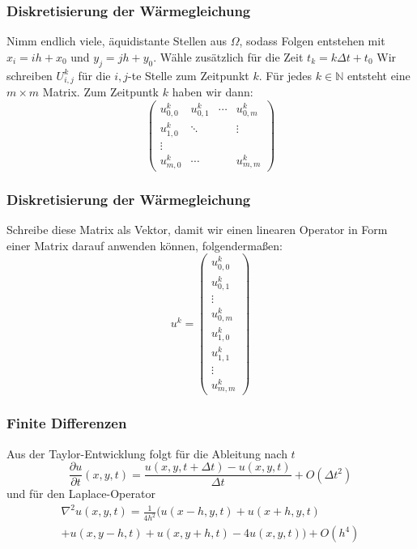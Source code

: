 \documentclass[xcolor = dvipsnames, notheorems, 10pt]{beamer}
\theoremstyle{definition}
\begin{document}
\begin{frame}
\frametitle{Diskretisierung der Wärmegleichung}
	Nimm endlich viele, äquidistante Stellen aus $\Omega$, sodass Folgen entstehen mit $x_i = ih + x_0$ und $y_j = jh + y_0$. Wähle zusätzlich für die Zeit $t_k = k\Delta t + t_0$ Wir schreiben $U_{i,j}^k$ für die $i,j$-te Stelle zum Zeitpunkt $k$. Für jedes $k \in \mathbb{N}$ entsteht eine $m \times m$ Matrix. Zum Zeitpuntk $k$ haben wir dann:
	$$
	\begin{pmatrix}
		u^k_{0,0}& 		u^k_{0,1}& \cdots & u^k_{0,m} 	\\
		u^k_{1,0}&		\ddots&			&\vdots	\\
		\vdots & & &	\\
		u^k_{m,0}&	\cdots	&			 & u^k_{m,m}
	\end{pmatrix}
	$$
\end{frame}
\begin{frame}
\frametitle{Diskretisierung der Wärmegleichung}
	Schreibe diese Matrix als Vektor, damit wir einen linearen Operator in Form einer Matrix darauf anwenden können, folgendermaßen:
	$$ u^k =
	\begin{pmatrix}
		u^k_{0,0} \\
		u^k_{0,1} \\
		\vdots \\
		u^k_{0,m} \\
		u^k_{1,0} \\
		u^k_{1,1} \\
		\vdots \\
		u^k_{m,m}
	\end{pmatrix}
	$$
\end{frame}
\begin{frame}
\frametitle{Finite Differenzen}
	Aus der Taylor-Entwicklung folgt für die Ableitung nach $t$
	$$\frac{\partial u}{\partial t}(x,y,t) = \frac{u(x,y,t+\Delta t) - u(x,y,t)}{\Delta t} + O(\Delta t^2)$$
	und für den Laplace-Operator
	\begin{multline*}
		\nabla^2u(x,y,t) = \frac{1}{4h^2} \bigg(u(x-h,y,t) + u(x+h,y,t) \\+ u(x,y-h,t) + u(x,y+h,t) - 4u(x,y,t) \bigg) + O(h^4)
	\end{multline*}
\end{frame}
\end{document}
